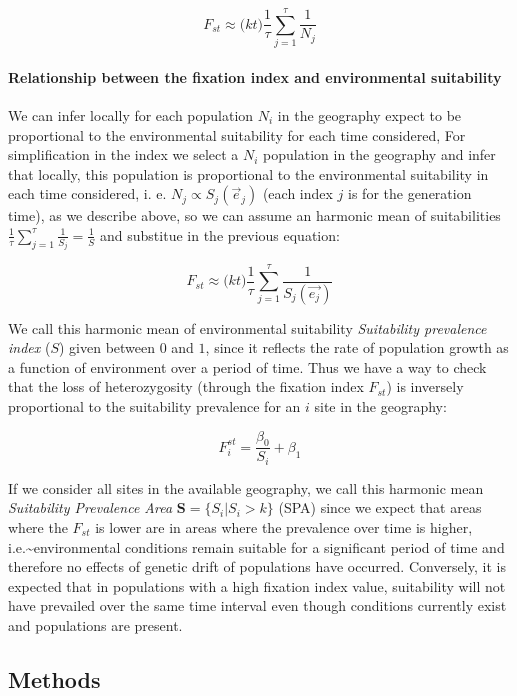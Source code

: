 \documentclass[
]{article}
\begin{document}
\[
F_{st} \approx \Big (kt\Big)  \frac{1}{\tau}\sum_{j=1}^{\tau}\frac{1}{N_j} 
\]

\hypertarget{relationship-between-the-fixation-index-and-environmental-suitability}{%
\paragraph{Relationship between the fixation index and environmental
suitability}\label{relationship-between-the-fixation-index-and-environmental-suitability}}

We can infer locally for each population \(N_i\) in the geography expect
to be proportional to the environmental suitability for each time
considered, For simplification in the index we select a \(N_i\)
population in the geography and infer that locally, this population is
proportional to the environmental suitability in each time considered,
i. e. \(N_{j} \propto S_{j}(\vec{e}_{j})\) (each index \(j\) is for the
generation time), as we describe above, so we can assume an harmonic mean
of suitabilities
\(\frac{1}{\tau}\sum_{j = 1}^{\tau} \frac{1}{S_j} = \frac{1}{S}\) and
substitue in the previous equation:

\[
F_{st} \approx \Big (kt\Big)  \frac{1}{\tau}\sum_{j=1}^{\tau}\frac{1}{S_j(\vec{e_j})}
\]

We call this harmonic mean of environmental suitability
\emph{Suitability prevalence index }(\(S\)) given between \(0\) and
\(1\), since it reflects the rate of population growth as a function of
environment over a period of time. Thus we have a way to check that the
loss of heterozygosity (through the fixation index \(F_{st}\)) is
inversely proportional to the suitability prevalence for an \(i\) site
in the geography:

\[
F_{i}^{st}= \frac{\beta_0}{S_i} + \beta_1
\]

If we consider all sites in the available geography, we call this
harmonic mean \emph{Suitability Prevalence Area}
\(\mathbf{S} = \{S_i | S_i > k\}\) (SPA) since we expect that areas
where the \(F_{st}\) is lower are in areas where the prevalence over
time is higher, i.e.\textasciitilde environmental conditions remain
suitable for a significant period of time and therefore no effects of
genetic drift of populations have occurred. Conversely, it is expected
that in populations with a high fixation index value, suitability will
not have prevailed over the same time interval even though conditions
currently exist and populations are present.

\hypertarget{methods}{%
\subsection{Methods}\label{methods}}
\end{document}
